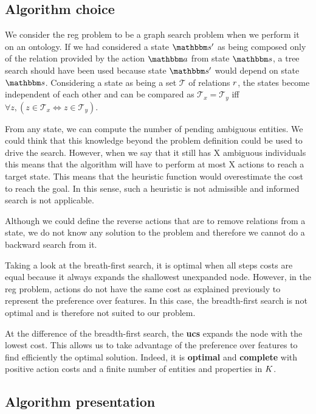 \subsection{Algorithm choice}

We consider the \acrshort{reg} problem to be a graph search problem when we perform it on an ontology. If we had considered a state $\state'$ as being composed only of the relation provided by the action $\action$ from state $\state$, a tree search should have been used because state $\state'$ would depend on state $\state$. Considering a state as being a set $\mathcal{T}$ of relations $r$, the states become independent of each other and can be compared as $\mathcal{T}_x = \mathcal{T}_y$ iff $\forall{z},(z\in \mathcal{T}_x \Leftrightarrow z\in \mathcal{T}_y)$.

From any state, we can compute the number of pending ambiguous entities. We could think that this knowledge beyond the problem definition could be used to drive the search. However, when we say that it still has X ambiguous individuals this means that the algorithm will have to perform at most X actions to reach a target state. This means that the heuristic function would overestimate the cost to reach the goal. In this sense, such a heuristic is not admissible and informed search is not applicable.

Although we could define the reverse actions that are to remove relations from a state, we do not know any solution to the problem and therefore we cannot do a backward search from it.

Taking a look at the breath-first search, it is optimal when all steps costs are equal because it always expands the shallowest unexpanded node. However, in the \acrshort{reg} problem, actions do not have the same cost as explained previously to represent the preference over features. In this case, the breadth-first search is not optimal and is therefore not suited to our problem.

At the difference of the breadth-first search, the \textbf{\acrfull{ucs}} expands the node with the lowest cost. This allows us to take advantage of the preference over features to find efficiently the optimal solution. Indeed, it is \textbf{optimal} and \textbf{complete} with positive action costs and a finite number of entities and properties in $K$.

\subsection{Algorithm presentation}

